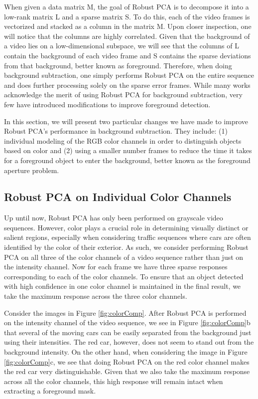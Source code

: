 \documentclass{article}
\begin{document}
When given a data matrix M, the goal of Robust PCA is to decompose it into a low-rank matrix L and a sparse matrix S. To do this, each of the video frames is vectorized and stacked as a column in the matrix M. Upon closer inspection, one will notice that the columns are highly correlated. %
Given that the background of a video lies on a low-dimensional subspace, we will see that the columns of L contain the background of each video frame and S contains the sparse deviations from that background, better known as foreground. Therefore, when doing background subtraction, one simply performs Robust PCA on the entire sequence and does further processing solely on the sparse error frames. While many works acknowledge the merit of using Robust PCA for background subtraction, very few have introduced modifications to improve foreground detection. 

In this section, we will present two particular changes we have made to improve Robust PCA's performance in background subtraction. They include: (1) individual modeling of the RGB color channels in order to distinguish objects based on color and (2) using a smaller number frames to reduce the time it takes for a foreground object to enter the background, better known as the foreground aperture problem.


\subsection{Robust PCA on Individual Color Channels}

Up until now, Robust PCA has only been performed on grayscale video sequences. However, color plays a crucial role in determining visually distinct or salient regions, especially when considering traffic sequences where cars are often identified by the color of their exterior. As such, we consider performing Robust PCA on all three of the color channels of a video sequence rather than just on the intensity channel. Now for each frame we have three sparse responses corresponding to each of the color channels. To ensure that an object detected with high confidence in one color channel is maintained in the final result, we take the maximum response across the three color channels.

Consider the images in Figure \ref{fig:colorComp}. After Robust PCA is performed on the intensity channel of the video sequence, we see in Figure \ref{fig:colorComp}b that several of the moving cars can be easily separated from the background just using their intensities. The red car, however, does not seem to stand out  from the background intensity. On the other hand, when considering the image in Figure \ref{fig:colorComp}c, we see that doing Robust PCA on the red color channel makes the red car very distinguishable. Given that we also take the maximum response across all the color channels, this high response will remain intact when extracting a foreground mask.
\end{document}
